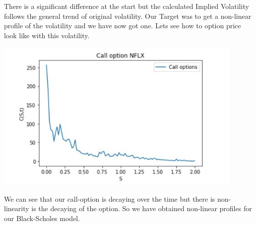 \documentclass[12pt]{article}
\begin{document}
There is a significant difference at the start but the calculated Implied Volatility follows the general trend of original volatility. Our Target was to get a non-linear profile of the volatility and we have now got one. Lets see how to option price look like with this volatility. 

\includegraphics[width=12cm]{p7}

We can see that our call-option is decaying over the time but there is non-linearity is the decaying of the option. So we have obtained non-linear profiles for our Black-Scholes model.




	
	

	
	
\end{document}
